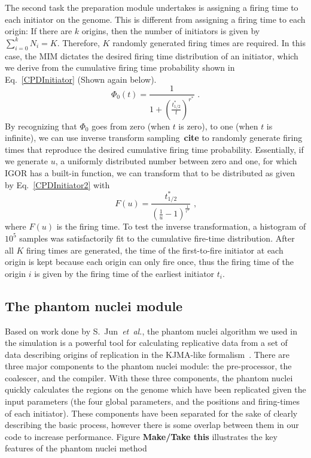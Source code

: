 			The second task the preparation module undertakes is assigning a firing time to each initiator on the genome.
			This is different from assigning a firing time to each origin: If there are $k$ origins, then the number of initiators is given by $\sum\nolimits_{i=0}^k N_i = K$.
			Therefore, $K$ randomly generated firing times are required.
			In this case, the MIM dictates the desired firing time distribution of an initiator, which we derive from the cumulative firing time probability shown in Eq.~\ref{CPDInitiator} (Shown again below).
			\begin{equation} \label{CPDInitiator2}
				\Phi_0(t) = \frac{1}{1+\left(\frac{t^*_{1/2}}{t}\right)^{r^*}}\text{ .}
			\end{equation}
			By recognizing that $\Phi_0$ goes from zero (when $t$ is zero), to one (when $t$ is infinite), we can use inverse transform sampling~\textbf{cite} to randomly generate firing times that reproduce the desired cumulative firing time probability.
			Essentially, if we generate $u$, a uniformly distributed number between zero and one, for which IGOR has a built-in function, we can transform that to be distributed as given by Eq.~\ref{CPDInitiator2} with
			\begin{equation}
				F(u) = \frac{t^*_{1/2}}{\left(\frac{1}{u}-1\right)^\frac{1}{r^*}} \text{ ,}
			\end{equation}
			where $F(u)$ is the firing time.
			To test the inverse transformation, a histogram of $10^5$ samples was satisfactorily fit to the cumulative fire-time distribution.
			After all $K$ firing times are generated, the time of the first-to-fire initiator at each origin is kept because each origin can only fire once, thus the firing time of the origin $i$ is given by the firing time of the earliest initiator $t_i$.
			
			
		\subsection{The phantom nuclei module}
		\label{subsec:PhanNuc}
		
		Based on work done by S.~Jun~\emph{et~al.}, the phantom nuclei algorithm we used in the simulation is a powerful tool for calculating replicative data from a set of data describing origins of replication in the KJMA-like formalism~\cite{KJMA1}.
		There are three major components to the phantom nuclei module: the pre-processor, the coalescer, and the compiler.
		With these three components, the phantom nuclei quickly calculates the regions on the genome which have been replicated given the input parameters (the four global parameters, and the positions and firing-times of each initiator).
		These components have been separated for the sake of clearly describing the basic process, however there is some overlap between them in our code to increase performance.
		Figure \textbf{Make/Take this} illustrates the key features of the phantom nuclei method
		
